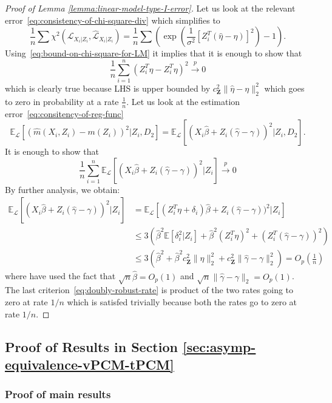 \documentclass[12pt]{article}
\theoremstyle{definition}
\theoremstyle{remark}
\newcommand{\E}{\mathbb E}								%
\newcommand{\srx}{X}									%
\newcommand{\prz}{\bm Z}								%
\newcommand{\srz}{Z}									%
\newcommand{\law}{\mathcal L}							%
\newcommand{\lawhat}{\widehat{\mathcal L}}				%
\begin{document}
\begin{proof}[Proof of Lemma \ref{lemma:linear-model-type-I-error}]
	Let us look at the relevant error~\eqref{eq:consistency-of-chi-square-div} which simplifies to
	$$
	\frac{1}{n}\sum  \chi^2( \law_{\srx_i | \srz_i} , \lawhat_{\srx_i|\srz_i}) = \frac{1}{n} \sum  \left(\exp\left(\frac{1}{\sigma^2}[\srz_i^T(\hat\eta-\eta)]^2\right) - 1\right).
	$$
	Using~\eqref{eq:bound-on-chi-square-for-LM} it implies that it is enough to show that	
	$$
	\frac{1}{n} \sum_{i=1}^n (\srz_i^T\hat \eta - \srz_i^T\eta)^2 \overset{p}{\to} 0
	$$
	which is clearly true because LHS is upper bounded by $c_{\prz}^2\|\widehat\eta - \eta\|_2^2 $ which goes to zero in probability at a rate $\frac{1}{n}$.
	Let us look at the estimation error~\eqref{eq:consitency-of-reg-func}
	$$
	\E_\law[(\widehat m(\srx_i,\srz_i)-m(\srz_i))^2| \srz_i,D_2]  = \E_\law[(\srx_i\hat \beta + \srz_i(\hat \gamma - \gamma))^2 | \srz_i,D_2] .
	$$
	It is enough to show that
	$$
	\frac{1}{n} \sum_{i=1}^n \E_\law[(\srx_i\hat \beta + \srz_i(\hat \gamma - \gamma))^2 | \srz_i] \overset{p}{\to} 0
	$$
	By further analysis, we obtain:
	\begin{align*}
		\E_\law[(\srx_i\hat \beta + \srz_i(\hat \gamma - \gamma))^2 | \srz_i] &=  \E_\law[(\srz_i^T\eta + \delta_i)\hat \beta + \srz_i(\hat \gamma - \gamma))^2 | \srz_i]\\
		&\leq 3 \left(\widehat\beta^2 \E [\delta_i^2|\srz_i] + \widehat\beta^2 (\srz_i^T\eta)^2 + (\srz_i^T(\widehat\gamma - \gamma))^2 \right)	\\	
		&\leq 3\left(\widehat\beta^2 + \widehat\beta^2 c^2_{\prz} \|\eta\|_2^2 + c^2_{\prz} \|\widehat \gamma - \gamma\|_2^2\right) = O_p\left(\frac{1}{n}\right) 
	\end{align*}
	where have used the fact that $\sqrt n\widehat\beta = O_p(1)$ and $\sqrt n\|\widehat \gamma - \gamma\|_2 = O_p(1)$.
	The last criterion~\eqref{eq:doubly-robust-rate} is product of the two rates going to zero at rate $1/n$ which  is satisfed trivially because both the rates go to zero at rate $1/n$.
\end{proof}

\subsection{Proof of Results in Section \ref{sec:asymp-equivalence-vPCM-tPCM}}

\subsubsection{Proof of main results}
\end{document}
